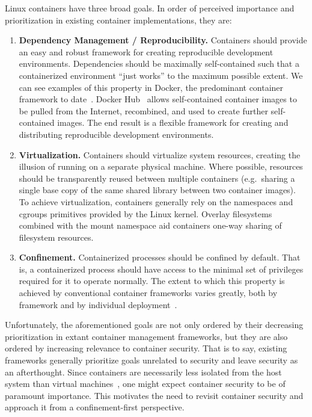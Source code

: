 Linux containers have three broad goals. In order of perceived importance and prioritization in existing
container implementations, they are:
\begin{enumerate}
  \item \textbf{Dependency Management / Reproducibility.}
    Containers should provide an easy and robust framework for creating reproducible
    development environments. Dependencies should be maximally self-contained such that
    a containerized environment \enquote{just works} to the maximum possible extent. We
    can see examples of this property in Docker, the predominant container framework to
    date~. Docker Hub~ allows self-contained container images to be
    pulled from the Internet, recombined, and used to create further self-contained
    images. The end result is a flexible framework for creating and distributing reproducible
    development environments.

  \item \textbf{Virtualization.}
    Containers should virtualize system resources, creating the illusion of running on
    a separate physical machine. Where possible, resources should be transparently reused
    between multiple containers (e.g.~sharing a single base copy of the same shared
    library between two container images). To achieve virtualization, containers generally
    rely on the namespaces and cgroups primitives provided by the Linux kernel. Overlay
    filesystems~ combined with the mount namespace aid containers one-way
    sharing of  filesystem resources.

  \item \textbf{Confinement.}
    Containerized processes should be confined by default. That is, a containerized
    process should have access to the minimal set of privileges required for it to operate
    normally. The extent to which this property is achieved by conventional container
    frameworks varies greatly, both by framework and by individual
    deployment~\cite{sultan2019_container_security, lin2018_container_security,
    bui2015_docker_analysis}.
\end{enumerate}

Unfortunately, the aforementioned goals are not only ordered by their decreasing
prioritization in extant container management frameworks, but they are also ordered by
increasing relevance to container security. That is to say, existing frameworks generally
prioritize goals unrelated to security and leave security as an afterthought. Since
containers are necessarily less isolated from the host system than virtual
machines~\cite{sultan2019_container_security, eder2016_hypervisor_container}, one might
expect container security to be of paramount importance. This motivates the need to
revisit container security and approach it from a confinement-first perspective.

